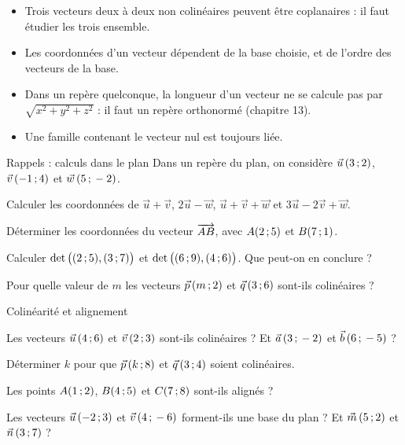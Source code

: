 \begin{attention}
\begin{itemize}[label={\color{otOrange}\textbullet},leftmargin=1.4em,itemsep=0.6mm,topsep=0.5mm]
  \item Trois vecteurs deux à deux non colinéaires peuvent être coplanaires : il faut étudier les trois ensemble.
  \item Les coordonnées d'un vecteur dépendent de la base choisie, et de l'ordre des vecteurs de la base.
  \item Dans un repère quelconque, la longueur d'un vecteur ne se calcule pas par $\sqrt{x^2+y^2+z^2}$ : il faut un repère
    orthonormé (chapitre 13).
  \item Une famille contenant le vecteur nul est toujours liée.
\end{itemize}
\end{attention}

\exercices
{}

\begin{exercice}[1]{Rappels : calculs dans le plan}
Dans un repère du plan, on considère $\vec u\,(3\,{;}\,2)$, $\vec v\,(-1\,{;}\,4)$ et $\vec w\,(5\,{;}\,-2)$.
\begin{questions}
  \item Calculer les coordonnées de $\vec u+\vec v$, $2\vec u-\vec w$, $\vec u+\vec v+\vec w$ et $3\vec u-2\vec v+\vec w$.
  \item Déterminer les coordonnées du vecteur $\overrightarrow{AB}$, avec $A(2\,{;}\,5)$ et $B(7\,{;}\,1)$.
  \item Calculer $\det\big((2\,{;}\,5),(3\,{;}\,7)\big)$ et $\det\big((6\,{;}\,9),(4\,{;}\,6)\big)$. Que peut-on en conclure ?
  \item Pour quelle valeur de $m$ les vecteurs $\vec p\,(m\,{;}\,2)$ et $\vec q\,(3\,{;}\,6)$ sont-ils colinéaires ?
\end{questions}
\end{exercice}

\begin{exercice}[1]{Colinéarité et alignement}
\begin{questions}
  \item Les vecteurs $\vec u\,(4\,{;}\,6)$ et $\vec v\,(2\,{;}\,3)$ sont-ils colinéaires ? Et $\vec a\,(3\,{;}\,-2)$ et $\vec b\,(6\,{;}\,-5)$ ?
  \item Déterminer $k$ pour que $\vec p\,(k\,{;}\,8)$ et $\vec q\,(3\,{;}\,4)$ soient colinéaires.
  \item Les points $A(1\,{;}\,2)$, $B(4\,{;}\,5)$ et $C(7\,{;}\,8)$ sont-ils alignés ?
  \item Les vecteurs $\vec u\,(-2\,{;}\,3)$ et $\vec v\,(4\,{;}\,-6)$ forment-ils une base du plan ? Et $\vec m\,(5\,{;}\,2)$ et $\vec n\,(3\,{;}\,7)$ ?
\end{questions}
\end{exercice}

